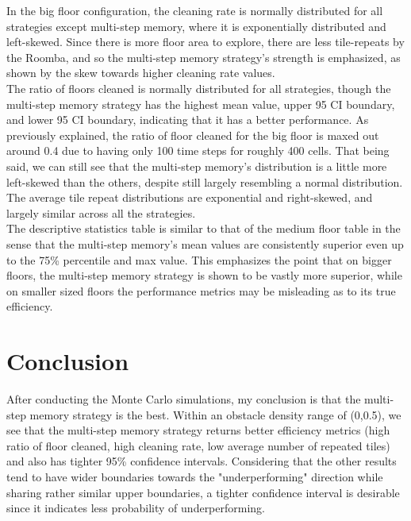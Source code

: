 \documentclass[11pt]{article}
\begin{document}
In the big floor configuration, the cleaning rate is normally
distributed for all strategies except multi-step memory, where it is
exponentially distributed and left-skewed. Since there is more floor
area to explore, there are less tile-repeats by the Roomba, and so the
multi-step memory strategy's strength is emphasized, as shown by the
skew towards higher cleaning rate values.\\

The ratio of floors cleaned is normally distributed for all strategies,
though the multi-step memory strategy has the highest mean value, upper
95 CI boundary, and lower 95 CI boundary, indicating that it has a
better performance. As previously explained, the ratio of floor cleaned
for the big floor is maxed out around 0.4 due to having only 100 time
steps for roughly 400 cells. That being said, we can still see that the
multi-step memory's distribution is a little more left-skewed than the
others, despite still largely resembling a normal distribution.\\

The average tile repeat distributions are exponential and right-skewed,
and largely similar across all the strategies.\\

The descriptive statistics table is similar to that of the medium floor
table in the sense that the multi-step memory's mean values are
consistently superior even up to the 75\% percentile and max value. This
emphasizes the point that on bigger floors, the multi-step memory
strategy is shown to be vastly more superior, while on smaller sized
floors the performance metrics may be misleading as to its true
efficiency.

    \section{Conclusion}

After conducting the Monte Carlo simulations, my conclusion is that the
multi-step memory strategy is the best. Within an obstacle density range
of (0,0.5), we see that the multi-step memory strategy returns better
efficiency metrics (high ratio of floor cleaned, high cleaning rate, low
average number of repeated tiles) and also has tighter 95\% confidence
intervals. Considering that the other results tend to have wider
boundaries towards the "underperforming" direction while sharing rather
similar upper boundaries, a tighter confidence interval is desirable
since it indicates less probability of underperforming.\\
\end{document}

